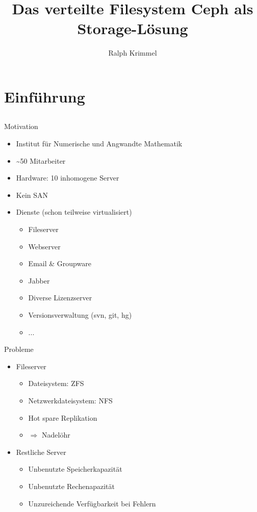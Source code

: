 \documentclass[notes=hide,yellow]{beamer}
\title{Das verteilte Filesystem Ceph als Storage-Lösung}
\subtitle{ }
\author{Ralph Krimmel}
\begin{document}
	\nocite{*} 
	\begin{frame}
		\titlepage
	\end{frame}

	\begin{frame}
		\tableofcontents
	\end{frame}


\section{Einf\"uhrung}
\subsection*{}

\begin{frame}{Motivation}

\begin{itemize}
	\item Institut f\"ur Numerische und Angwandte Mathematik
	\item \textasciitilde 50 Mitarbeiter
	\item Hardware: 10 inhomogene Server
	\item Kein SAN
	\item Dienste (schon teilweise virtualisiert)
	\begin{itemize}
		\item Fileserver
		\item Webserver
		\item Email \& Groupware
		\item Jabber
		\item Diverse Lizenzserver
		\item Versionsverwaltung (svn, git, hg)
		\item ...
	\end{itemize}
\end{itemize}
\end{frame}

\begin{frame}{Probleme}

	\begin{itemize}
		\item Fileserver
			\begin{itemize}
				\item Dateisystem: ZFS 
				\item Netzwerkdateisystem: NFS
				\item \glqq Hot spare Replikation\grqq 
				\item $\Rightarrow$ Nadel\"ohr
			\end{itemize} 
		\item <2> Restliche Server
			\begin{itemize}
				\item Unbenutzte Speicherkapazit\"at
				\item Unbenutzte Rechenapazit\"at
				\item Unzureichende Verf\"ugbarkeit bei Fehlern
			\end{itemize}
	\end{itemize}
\end{frame}
\end{document}
